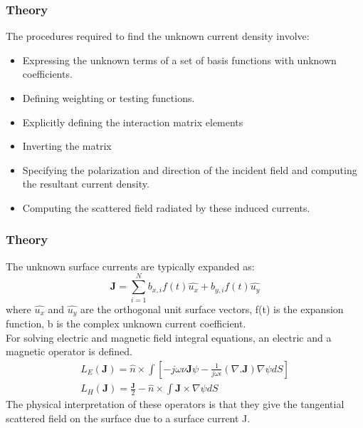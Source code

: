 \documentclass{beamer}
\begin{document}
\begin{frame}
\frametitle{Theory}
The procedures required to find the unknown current density involve:
\begin{itemize}
\item Expressing the unknown terms of a set of basis functions with unknown coefficients.
\item Defining weighting or testing functions.
\item Explicitly defining the interaction matrix elements
\item Inverting the matrix
\item Specifying the polarization and direction of the incident field and computing the resultant current density.
\item Computing the scattered field radiated by these induced currents.
\end{itemize}
\end{frame}

\begin{frame}
\frametitle{Theory}
The unknown surface currents are typically expanded as:
\begin{equation}
\textbf{J} = \sum_{i=1}^N b_{x,i}f(t)\hat{u_x} + b_{y,i}f(t)\hat{u_y}
\end{equation}
where $\hat{u_x}$ and $\hat{u_y}$ are the orthogonal unit surface vectors, f(t) is the expansion function, b is the complex unknown current coefficient.\\
For solving electric and magnetic field integral equations, an electric and a magnetic operator is defined. 
\begin{eqnarray}
L_E(\textbf{J}) = \hat{n}\times\int[-j\omega\nu\textbf{J}\psi -\frac{1}{j\omega\epsilon}(\nabla . \textbf{J}) \nabla \psi dS]\\
L_H(\textbf{J}) = \frac{\textbf{J}}{2} - \hat{n} \times \int \textbf{J} \times \nabla \psi dS
\end{eqnarray}
The physical interpretation of these operators is that they give the tangential scattered field on the surface due to a surface current J.
\end{frame}
\end{document}
